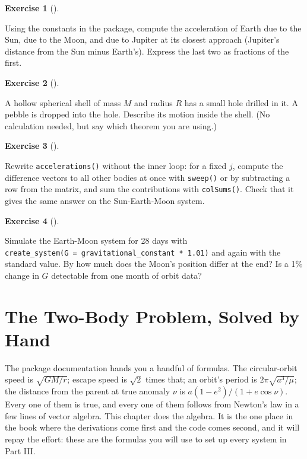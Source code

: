 \documentclass[
  10.5pt,
  letterpaper,
]{scrbook}
\theoremstyle{definition}
\newtheorem{exercise}{Exercise}[chapter]
\theoremstyle{plain}
\theoremstyle{remark}
\begin{document}

\begin{exercise}[]\protect\hypertarget{exr-ch3-ratio}{}\label{exr-ch3-ratio}

Using the constants in the package, compute the acceleration of Earth
due to the Sun, due to the Moon, and due to Jupiter at its closest
approach (Jupiter's distance from the Sun minus Earth's). Express the
last two as fractions of the first.

\end{exercise}

\begin{exercise}[]\protect\hypertarget{exr-ch3-shell}{}\label{exr-ch3-shell}

A hollow spherical shell of mass \(M\) and radius \(R\) has a small hole
drilled in it. A pebble is dropped into the hole. Describe its motion
inside the shell. (No calculation needed, but say which theorem you are
using.)

\end{exercise}

\begin{exercise}[]\protect\hypertarget{exr-ch3-vectorize}{}\label{exr-ch3-vectorize}

Rewrite \texttt{accelerations()} without the inner loop: for a fixed
\(j\), compute the difference vectors to all other bodies at once with
\texttt{sweep()} or by subtracting a row from the matrix, and sum the
contributions with \texttt{colSums()}. Check that it gives the same
answer on the Sun-Earth-Moon system.

\end{exercise}

\begin{exercise}[]\protect\hypertarget{exr-ch3-g}{}\label{exr-ch3-g}

Simulate the Earth-Moon system for 28 days with
\texttt{create\_system(G\ =\ gravitational\_constant\ *\ 1.01)} and
again with the standard value. By how much does the Moon's position
differ at the end? Is a 1\% change in \(G\) detectable from one month of
orbit data?

\end{exercise}

\chapter{The Two-Body Problem, Solved by Hand}\label{sec-two-body}

The package documentation hands you a handful of formulas. The
circular-orbit speed is \(\sqrt{GM/r}\); escape speed is \(\sqrt{2}\)
times that; an orbit's period is \(2\pi\sqrt{a^3/\mu}\); the distance
from the parent at true anomaly \(\nu\) is \(a(1-e^2)/(1+e\cos\nu)\).
Every one of them is true, and every one of them follows from Newton's
law in a few lines of vector algebra. This chapter does the algebra. It
is the one place in the book where the derivations come first and the
code comes second, and it will repay the effort: these are the formulas
you will use to set up every system in Part III.
\end{document}
